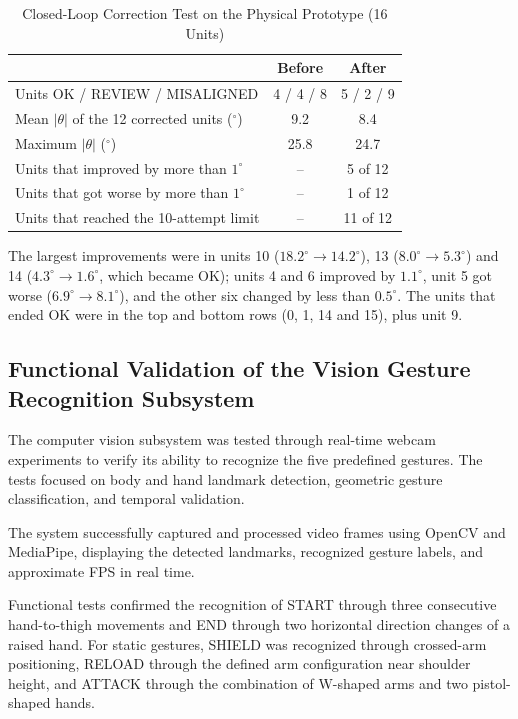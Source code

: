 \documentclass[lettersize,journal]{IEEEtran}
\begin{document}
	\begin{table}[!t]
		\centering
		\caption{Closed-Loop Correction Test on the Physical Prototype (16 Units)}
		\label{tab:closed_loop}
		\scriptsize
		\setlength{\tabcolsep}{3pt}
		\renewcommand{\arraystretch}{1.08}
		\begin{tabularx}{\columnwidth}{@{}Y c c@{}}
			\toprule
			 & Before & After\\
			\midrule
			Units OK / REVIEW / MISALIGNED & 4 / 4 / 8 & 5 / 2 / 9\\
			Mean $|\theta|$ of the 12 corrected units ($^\circ$) & 9.2 & 8.4\\
			Maximum $|\theta|$ ($^\circ$) & 25.8 & 24.7\\
			Units that improved by more than $1^\circ$ & -- & 5 of 12\\
			Units that got worse by more than $1^\circ$ & -- & 1 of 12\\
			Units that reached the 10-attempt limit & -- & 11 of 12\\
			\bottomrule
		\end{tabularx}
	\end{table}

	The largest improvements were in units 10 ($18.2^\circ \rightarrow 14.2^\circ$), 13 ($8.0^\circ \rightarrow 5.3^\circ$) and 14 ($4.3^\circ \rightarrow 1.6^\circ$, which became OK); units 4 and 6 improved by $1.1^\circ$, unit 5 got worse ($6.9^\circ \rightarrow 8.1^\circ$), and the other six changed by less than $0.5^\circ$. The units that ended OK were in the top and bottom rows (0, 1, 14 and 15), plus unit 9.
	
	\subsection{Functional Validation of the Vision Gesture Recognition Subsystem}
	
	The computer vision subsystem was tested through real-time webcam experiments to verify its ability to recognize the five predefined gestures. The tests focused on body and hand landmark detection, geometric gesture classification, and temporal validation.
	
	The system successfully captured and processed video frames using OpenCV and MediaPipe, displaying the detected landmarks, recognized gesture labels, and approximate FPS in real time.
	
	Functional tests confirmed the recognition of START through three consecutive hand-to-thigh movements and END through two horizontal direction changes of a raised hand. For static gestures, SHIELD was recognized through crossed-arm positioning, RELOAD through the defined arm configuration near shoulder height, and ATTACK through the combination of W-shaped arms and two pistol-shaped hands.
	
\end{document}
